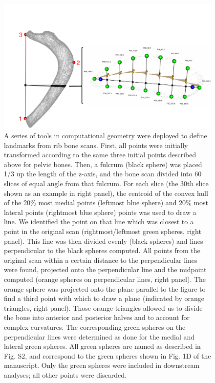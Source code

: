 \documentclass[12pt]{article}
\begin{document}
 
\begin{figure}
\begin{center}
  \includegraphics[width=\textwidth]{S4}
\end{center}
\caption{
A series of tools in computational geometry were deployed to define landmarks from rib bone scans.  First, all points were initially transformed according to the same three initial points described above for pelvic bones.  Then, a fulcrum (black sphere) was placed 1/3 up the length of the z-axis, and the bone scan divided into 60 slices of equal angle from that fulcrum.  For each slice (the 30th slice shown as an example in right panel), the centroid of the convex hull of the 20\% most medial points (leftmost blue sphere) and 20\% most lateral points (rightmost blue sphere) points was used to draw a line.  We identified the point on that line which was closest to a point in the original scan (rightmost/leftmost green spheres, right panel).  This line was then divided evenly (black spheres) and lines perpendicular to the black spheres computed.  All points from the original scan within a certain distance to the perpendicular lines were found, projected onto the perpendicular line and the midpoint computed (orange spheres on perpendicular lines, right panel).  The orange sphere was projected onto the plane parallel to the figure to find a third point with which to draw a plane (indicated by orange triangles, right panel).  Those orange triangles allowed us to divide the bone into anterior and posterior halves and to account for complex curvatures.  The corresponding green spheres on the perpendicular lines were determined as done for the medial and lateral green spheres.  All green spheres are named as described in Fig. S2, and correspond to the green spheres shown in Fig. 1D of the manuscript.  Only the green spheres were included in downstream analyses; all other points were discarded. 
}
\end{figure}
\end{document}
